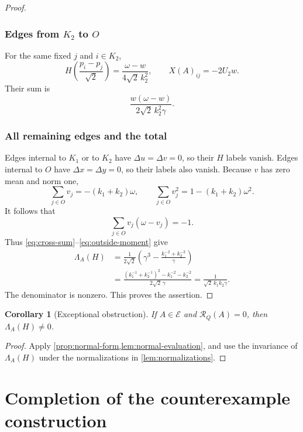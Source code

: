 \documentclass[11pt,reqno]{amsart}
\newtheorem{corollary}[corollary]{Corollary}
\theoremstyle{definition}
\theoremstyle{remark}
\numberwithin{equation}{section}
\newcommand{\Exc}{\mathcal E}
\begin{document}
\begin{proof}
\subsubsection*{Edges from $K_2$ to $O$}
For the same fixed $j$ and $i\in K_2$,
\[
 H\!\left(\frac{p_i-p_j}{\sqrt2}\right)
       =\frac{\omega-w}{4\sqrt2\,k_2^2},\qquad
 X(A)_{ij}=-2U_2w.
\]
Their sum is
\begin{equation}\label{eq:K2O}
 \frac{w(\omega-w)}{2\sqrt2\,k_2^2\gamma}.
\end{equation}

\subsubsection*{All remaining edges and the total}
Edges internal to $K_1$ or to $K_2$ have $\Delta u=\Delta v=0$,
so their $H$ labels vanish. Edges internal to $O$ have
$\Delta x=\Delta y=0$, so their labels also vanish.
Because $v$ has zero mean and norm one,
\[
 \sum_{j\in O}v_j=-(k_1+k_2)\omega,\qquad
 \sum_{j\in O}v_j^2=1-(k_1+k_2)\omega^2.
\]
It follows that
\begin{equation}\label{eq:outside-moment}
 \sum_{j\in O}v_j(\omega-v_j)=-1.
\end{equation}
Thus \eqref{eq:cross-sum}--\eqref{eq:outside-moment} give
\begin{align*}
 \Lambda_A(H)
 &=\frac1{2\sqrt2}
       \left(\gamma^3-
          \frac{k_1^{-2}+k_2^{-2}}{\gamma}\right)\\
 &=\frac{(k_1^{-1}+k_2^{-1})^2-k_1^{-2}-k_2^{-2}}
          {2\sqrt2\,\gamma}
  =\frac1{\sqrt2\,k_1k_2\gamma}.
\end{align*}
The denominator is nonzero. This proves the assertion.
\end{proof}

\begin{corollary}[Exceptional obstruction]\label{cor:exceptional}
If $A\in\Exc$ and $\mathcal R_Q(A)=0$, then $\Lambda_A(H)\ne0$.
\end{corollary}
\begin{proof}
Apply \cref{prop:normal-form,lem:normal-evaluation}, and use the
invariance of $\Lambda_A(H)$ under the normalizations in
\cref{lem:normalizations}.
\end{proof}

\section{Completion of the counterexample construction}\label{sec:completion}
\end{document}
